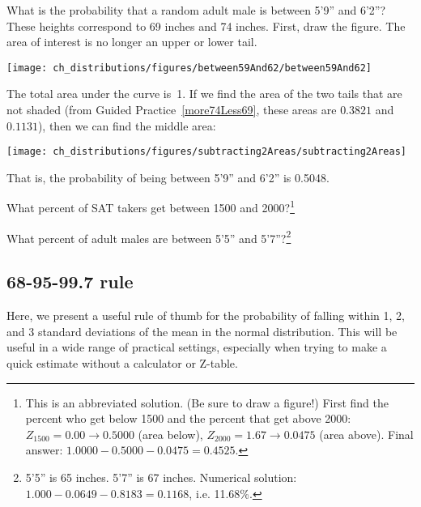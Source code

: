 \begin{example}{What is the probability that a random adult male is between 5'9'' and 6'2''?}
These heights correspond to 69 inches and 74 inches. First, draw the figure. The area of interest is no longer an upper or lower tail.\textC{\vspace{-2mm}}
\begin{center}
\texttt{[image: ch\_distributions/figures/between59And62/between59And62]}\textC{\vspace{-2mm}}
\end{center}
The total area under the curve is~1. If we find the area of the two tails that are not shaded (from Guided Practice~\ref{more74Less69}, these areas are $0.3821$ and $0.1131$), then we can find the middle area:\textC{\vspace{-2mm}}
\begin{center}
\texttt{[image: ch\_distributions/figures/subtracting2Areas/subtracting2Areas]}\textC{\vspace{-2mm}}
\end{center}
That is, the probability of being between 5'9'' and 6'2'' is 0.5048.
\end{example}

\begin{exercise}
What percent of SAT takers get between 1500 and 2000?\footnote{This is an abbreviated solution. (Be sure to draw a figure!) First find the percent who get below 1500 and the percent that get above 2000: $Z_{1500} = 0.00 \to 0.5000$ (area below), $Z_{2000} = 1.67 \to 0.0475$ (area above). Final answer: $1.0000-0.5000 - 0.0475 = 0.4525$.}
\end{exercise}

\begin{exercise}
What percent of adult males are between 5'5'' and 5'7''?\footnote{5'5'' is 65 inches. 5'7'' is 67 inches. Numerical solution: $1.000 - 0.0649 - 0.8183 = 0.1168$, i.e. 11.68\%.}
\end{exercise}



\subsection{68-95-99.7 rule}

Here, we present a useful rule of thumb for the probability of falling within 1, 2, and 3 standard deviations of the mean in the normal distribution. This will be useful in a wide range of practical settings, especially when trying to make a quick estimate without a calculator or Z-table.

